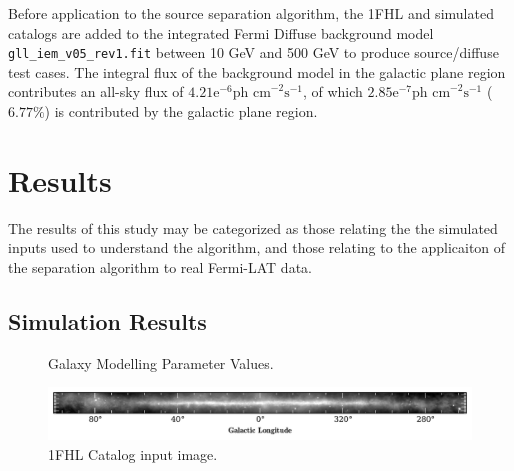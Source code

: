 \documentclass{PoS}
\begin{document}
Before application to the source separation algorithm, the 1FHL and simulated catalogs are added to the integrated Fermi Diffuse background model \verb|gll_iem_v05_rev1.fit| between 10 GeV and 500 GeV to produce source/diffuse test cases. The integral flux of the background model in the galactic plane region contributes an all-sky flux of $4.21\text{e}^{-6} \text{ph cm}^{-2}\text{s}^{-1}$, of which $2.85\text{e}^{-7} \text{ph cm}^{-2}\text{s}^{-1}$ ($6.77\%$) is contributed by the galactic plane region.


\section{Results}

The results of this study may be categorized as those relating the the simulated inputs used to understand the algorithm, and those relating to the applicaiton of the separation algorithm to real Fermi-LAT data.

\subsection{Simulation Results}

\begin{figure}
\centering
{}
\caption{Galaxy Modelling Parameter Values.}
\end{figure}

\begin{figure}
  \begin{center}
      \includegraphics[width=\textwidth]{figures/1FHL.pdf}
  \caption{1FHL Catalog input image.}
  \end{center}
\end{figure}
\end{document}
